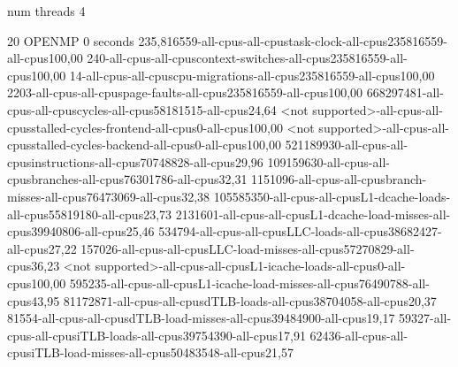 num threads 4

20
OPENMP
0 seconds
235,816559-all-cpus-all-cpustask-clock-all-cpus235816559-all-cpus100,00
240-all-cpus-all-cpuscontext-switches-all-cpus235816559-all-cpus100,00
14-all-cpus-all-cpuscpu-migrations-all-cpus235816559-all-cpus100,00
2203-all-cpus-all-cpuspage-faults-all-cpus235816559-all-cpus100,00
668297481-all-cpus-all-cpuscycles-all-cpus58181515-all-cpus24,64
<not supported>-all-cpus-all-cpusstalled-cycles-frontend-all-cpus0-all-cpus100,00
<not supported>-all-cpus-all-cpusstalled-cycles-backend-all-cpus0-all-cpus100,00
521189930-all-cpus-all-cpusinstructions-all-cpus70748828-all-cpus29,96
109159630-all-cpus-all-cpusbranches-all-cpus76301786-all-cpus32,31
1151096-all-cpus-all-cpusbranch-misses-all-cpus76473069-all-cpus32,38
105585350-all-cpus-all-cpusL1-dcache-loads-all-cpus55819180-all-cpus23,73
2131601-all-cpus-all-cpusL1-dcache-load-misses-all-cpus39940806-all-cpus25,46
534794-all-cpus-all-cpusLLC-loads-all-cpus38682427-all-cpus27,22
157026-all-cpus-all-cpusLLC-load-misses-all-cpus57270829-all-cpus36,23
<not supported>-all-cpus-all-cpusL1-icache-loads-all-cpus0-all-cpus100,00
595235-all-cpus-all-cpusL1-icache-load-misses-all-cpus76490788-all-cpus43,95
81172871-all-cpus-all-cpusdTLB-loads-all-cpus38704058-all-cpus20,37
81554-all-cpus-all-cpusdTLB-load-misses-all-cpus39484900-all-cpus19,17
59327-all-cpus-all-cpusiTLB-loads-all-cpus39754390-all-cpus17,91
62436-all-cpus-all-cpusiTLB-load-misses-all-cpus50483548-all-cpus21,57

